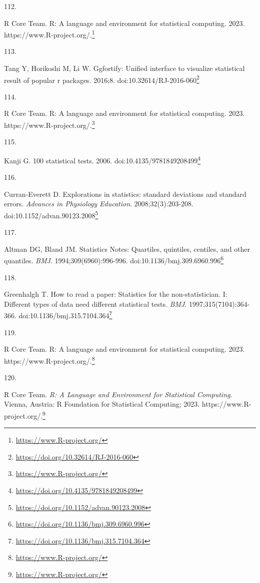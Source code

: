\documentclass[
  a4paper,
]{book}
\newlength{\cslhangindent}
\newlength{\csllabelwidth}
\newlength{\cslentryspacingunit} %
\newenvironment{CSLReferences}[2] %
 {%
  \setlength{\parindent}{0pt}
  \ifodd #1
  \let\oldpar\par
  \def\par{\hangindent=\cslhangindent\oldpar}
  \fi
  \setlength{\parskip}{#2\cslentryspacingunit}
 }%
 {}
\newcommand{\CSLLeftMargin}[1]{\parbox[t]{\csllabelwidth}{#1}}
\newcommand{\CSLRightInline}[1]{\parbox[t]{\linewidth - \csllabelwidth}{#1}\break}
\renewcommand{\href}[2]{#2\footnote{\url{#1}}}
\begin{document}
\begin{CSLReferences}{0}{0}
\leavevmode{}%
\CSLLeftMargin{112. }%
\CSLRightInline{R Core Team. R: A language and environment for statistical computing. 2023. \href{https://www.R-project.org/}{https://www.R-project.org/.}}

\leavevmode{}%
\CSLLeftMargin{113. }%
\CSLRightInline{Tang Y, Horikoshi M, Li W. Ggfortify: Unified interface to visualize statistical result of popular r packages. 2016;8. doi:\href{https://doi.org/10.32614/RJ-2016-060}{10.32614/RJ-2016-060}}

\leavevmode{}%
\CSLLeftMargin{114. }%
\CSLRightInline{R Core Team. R: A language and environment for statistical computing. 2023. \href{https://www.R-project.org/}{https://www.R-project.org/.}}

\leavevmode{}%
\CSLLeftMargin{115. }%
\CSLRightInline{Kanji G. 100 statistical tests. 2006. doi:\href{https://doi.org/10.4135/9781849208499}{10.4135/9781849208499}}

\leavevmode{}%
\CSLLeftMargin{116. }%
\CSLRightInline{Curran-Everett D. Explorations in statistics: standard deviations and standard errors. \emph{Advances in Physiology Education}. 2008;32(3):203-208. doi:\href{https://doi.org/10.1152/advan.90123.2008}{10.1152/advan.90123.2008}}

\leavevmode{}%
\CSLLeftMargin{117. }%
\CSLRightInline{Altman DG, Bland JM. Statistics Notes: Quartiles, quintiles, centiles, and other quantiles. \emph{BMJ}. 1994;309(6960):996-996. doi:\href{https://doi.org/10.1136/bmj.309.6960.996}{10.1136/bmj.309.6960.996}}

\leavevmode{}%
\CSLLeftMargin{118. }%
\CSLRightInline{Greenhalgh T. How to read a paper: Statistics for the non-statistician. I: Different types of data need different statistical tests. \emph{BMJ}. 1997;315(7104):364-366. doi:\href{https://doi.org/10.1136/bmj.315.7104.364}{10.1136/bmj.315.7104.364}}

\leavevmode{}%
\CSLLeftMargin{119. }%
\CSLRightInline{R Core Team. R: A language and environment for statistical computing. 2023. \href{https://www.R-project.org/}{https://www.R-project.org/.}}

\leavevmode{}%
\CSLLeftMargin{120. }%
\CSLRightInline{R Core Team. \emph{{R}: A Language and Environment for Statistical Computing}. Vienna, Austria: R Foundation for Statistical Computing; 2023. \href{https://www.R-project.org/}{https://www.R-project.org/.}}


\end{CSLReferences}
\end{document}
